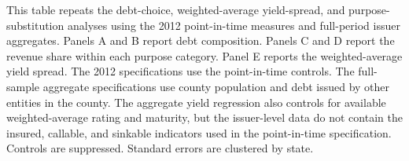 \newpage
\begin{table}[H]\centering
\caption{\textbf{Robustness to alternative measurement periods}}
\label{tab:alternative_sample_robustness}
\parbox{\textwidth}{This table repeats the debt-choice, weighted-average yield-spread, and purpose-substitution analyses using the 2012 point-in-time measures and full-period issuer aggregates. Panels A and B report debt composition. Panels C and D report the revenue share within each purpose category. Panel E reports the weighted-average yield spread. The 2012 specifications use the point-in-time controls. The full-sample aggregate specifications use county population and debt issued by other entities in the county. The aggregate yield regression also controls for available weighted-average rating and maturity, but the issuer-level data do not contain the insured, callable, and sinkable indicators used in the point-in-time specification. Controls are suppressed. Standard errors are clustered by state.}
\end{table}

\vspace{10pt}

\vspace{10pt}

\vspace{10pt}

\vspace{10pt}

